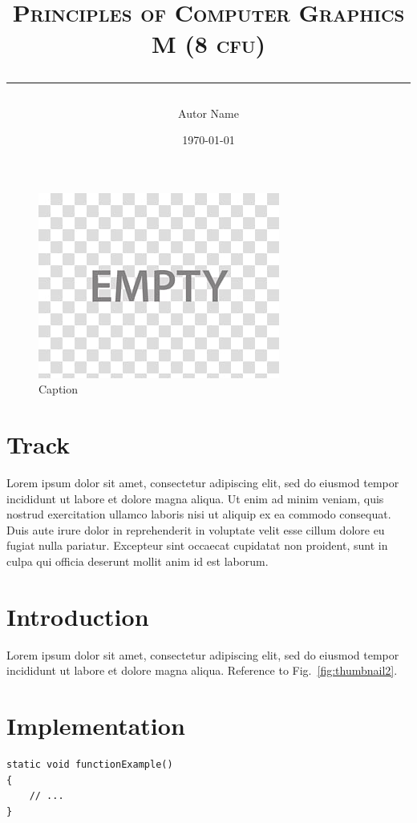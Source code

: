 \documentclass[11pt]{article}
\title{\textsc{Principles of Computer Graphics M (8 cfu)} \\[\subtitlelinesep]

\smaller[\subtitlerelsize]{\textcolor{gray}{\textsc{Lab N - Title}}} 
\vspace{10pt}\hrule\vspace{10pt}}
\author{Autor Name}
\date{\today}
\begin{document}
\maketitle

\begin{figure}[H]
    \centering
    \includegraphics[width=1.\columnwidth]{gfx/Thumbnail.jpg}
    \caption{Caption}
    \label{fig:thumbnail1}
\end{figure}

\section*{Track}
Lorem ipsum dolor sit amet, consectetur adipiscing elit, sed do eiusmod tempor incididunt ut labore et dolore magna aliqua. Ut enim ad minim veniam, quis nostrud exercitation ullamco laboris nisi ut aliquip ex ea commodo consequat. Duis aute irure dolor in reprehenderit in voluptate velit esse cillum dolore eu fugiat nulla pariatur. Excepteur sint occaecat cupidatat non proident, sunt in culpa qui officia deserunt mollit anim id est laborum.

\section{Introduction}
Lorem ipsum dolor sit amet, consectetur adipiscing elit, sed do eiusmod tempor incididunt ut labore et dolore magna aliqua. 
Reference to Fig.~\ref{fig:thumbnail2}.

\section{Implementation}
\begin{verbatim}
static void functionExample()
{
    // ...
}
\end{verbatim}
\end{document}
